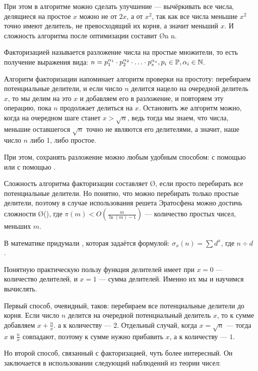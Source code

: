 При этом в алгоритме можно сделать улучшение — вычёркивать все числа, делящиеся на простое $x$ можно не от $2x$, а от $x^2$, так как все числа меньшие $x^2$ точно имеют делитель, не превосходящий их корня, а значит меньший $x$. И сложность алгоритма после оптимизации составит \O{n \log\log n}.


Факторизацией называется разложение числа на простые множители, то есть получение выражения вида: $n = p_1^{\alpha_1} \cdot p_2^{\alpha_2} \cdot \ldots \cdot p_s^{\alpha_s}, p_i \in \mathbb{P}, \alpha_i \in \mathbb{N}$.

Алгоритм факторизации напоминает алгоритм проверки на простоту: перебираем потенциальные делители, и если число $n$ делится нацело на очередной делитель $x$, то мы делим на это $x$ и добавляем его в разложение, и повторяем эту операцию, пока $n$ продолжает делиться на $x$. Остановить же алгоритм можно, когда на очередном шаге станет $x > \sqrt{n}$, ведь тогда мы знаем, что числа, меньшие оставшегося $\sqrt{n}$ точно не являются его делителями, а значит, наше число $n$ либо 1, либо простое.

При этом, сохранять разложение можно любым удобным способом: с помощью  или с помощью .

Сложность алгоритма факторизации составляет \O{}, если просто перебирать все потенциальные делители. Но понятно, что можно перебирать только простые делители, поэтому в случае использования решета Эратосфена можно достичь сложности \O{\pi()}, где $\pi(m) < O\left(\frac{m}{\ln(m) - 1}\right)$ — количество простых чисел, меньших $m$.


В математике придумали , которая задаётся формулой: $\sigma_x(n) = \sum d^x$, где $n \div d$.

Понятную практическую пользу функция делителей имеет при $x = 0$ — количество делителей, и $x = 1$ — сумма делителей. Именно их мы и научимся вычислять.

Первый способ, очевидный, таков: перебираем все потенциальные делители до корня. Если число $n$ делится на очередной потенциальный делитель $x$, то к сумме добавляем $x + \frac{n}{x}$. а к количеству — $2$. Отдельный случай, когда $x = \sqrt{n}$ — тогда $x$ и $\frac{n}{x}$ совпадают, поэтому к сумме нужно прибавить $x$, а к количеству — $1$.

Но второй способ, связанный с факторизацией, чуть более интересный. Он заключается в использовании следующий наблюдений из теории чисел:

